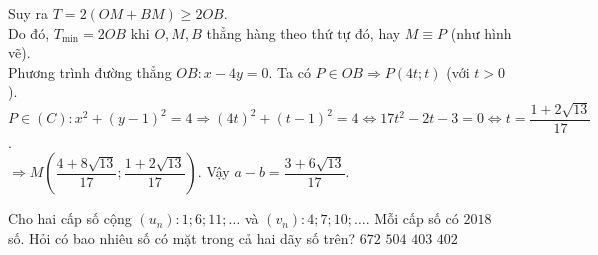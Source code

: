 \begin{ex}
{\begin{itemize}
		Suy ra $T=2(OM+BM)\geqslant 2OB$.\\Do đó, $T_{\text{min}}=2OB$ khi $O,M,B$ thẳng hàng theo thứ tự đó, hay $M\equiv P$ (như hình vẽ).\\
		Phương trình đường thẳng $OB\colon x-4y=0$. Ta có $P\in OB \Rightarrow P(4t;t)$ (với $t>0$).\\
		$P\in (C)\colon x^2+(y-1)^2=4 \Rightarrow (4t)^2+(t-1)^2=4 \Leftrightarrow 17t^2-2t-3=0 \Leftrightarrow t=\dfrac{1+2\sqrt{13}}{17}$.\\
		$\Rightarrow M\left(\dfrac{4+8\sqrt{13}}{17};\dfrac{1+2\sqrt{13}}{17}\right)$. Vậy $a-b=\dfrac{3+6\sqrt{13}}{17}$.	
	\end{itemize}
	}
\end{ex}
\begin{ex}%
	Cho hai cấp số cộng $(u_n)\colon 1;6;11;\ldots$ và $(v_n)\colon 4;7;10;\ldots$. Mỗi cấp số có $2018$ số. Hỏi có bao nhiêu số có mặt trong cả hai dãy số trên?
	\choice
	{$672$}
	{$504$}
	{\True $403$}
	{$402$}
\end{ex}

